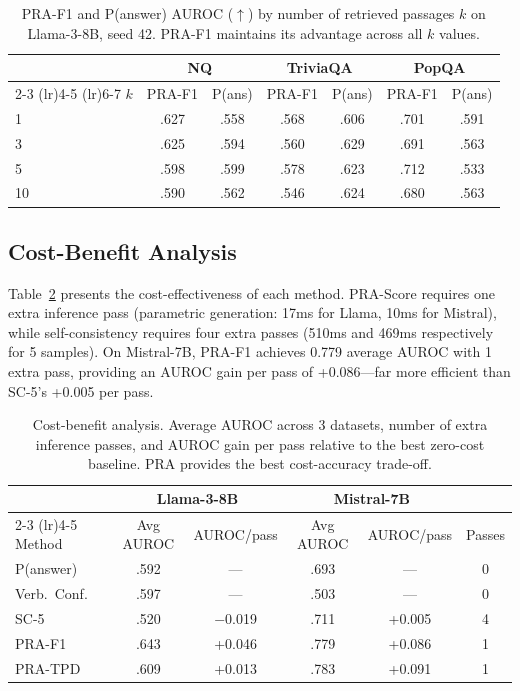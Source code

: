 \documentclass{article}
\begin{document}
\begin{table}[t]
\caption{PRA-F1 and P(answer) AUROC ($\uparrow$) by number of retrieved passages $k$ on Llama-3-8B, seed 42. PRA-F1 maintains its advantage across all $k$ values.}
\label{tab:topk}
\centering
\small
\begin{tabular}{lcccccc}
\toprule
& \multicolumn{2}{c}{NQ} & \multicolumn{2}{c}{TriviaQA} & \multicolumn{2}{c}{PopQA} \\
\cmidrule(lr){2-3} \cmidrule(lr){4-5} \cmidrule(lr){6-7}
$k$ & PRA-F1 & P(ans) & PRA-F1 & P(ans) & PRA-F1 & P(ans) \\
\midrule
1  & .627 & .558 & .568 & .606 & .701 & .591 \\
3  & .625 & .594 & .560 & .629 & .691 & .563 \\
5  & .598 & .599 & .578 & .623 & .712 & .533 \\
10 & .590 & .562 & .546 & .624 & .680 & .563 \\
\bottomrule
\end{tabular}
\end{table}

\subsection{Cost-Benefit Analysis}
\label{sec:cost_benefit}

Table~\ref{tab:cost} presents the cost-effectiveness of each method. PRA-Score requires one extra inference pass (parametric generation: 17ms for Llama, 10ms for Mistral), while self-consistency requires four extra passes (510ms and 469ms respectively for 5 samples). On Mistral-7B, PRA-F1 achieves 0.779 average AUROC with 1 extra pass, providing an AUROC gain per pass of +0.086---far more efficient than SC-5's +0.005 per pass.

\begin{table}[t]
\caption{Cost-benefit analysis. Average AUROC across 3 datasets, number of extra inference passes, and AUROC gain per pass relative to the best zero-cost baseline. PRA provides the best cost-accuracy trade-off.}
\label{tab:cost}
\centering
\small
\begin{tabular}{lccccc}
\toprule
& \multicolumn{2}{c}{Llama-3-8B} & \multicolumn{2}{c}{Mistral-7B} & \\
\cmidrule(lr){2-3} \cmidrule(lr){4-5}
Method & Avg AUROC & AUROC/pass & Avg AUROC & AUROC/pass & Passes \\
\midrule
P(answer) & .592 & --- & .693 & --- & 0 \\
Verb.\ Conf. & .597 & --- & .503 & --- & 0 \\
SC-5 & .520 & $-$0.019 & .711 & +0.005 & 4 \\
PRA-F1 & .643 & +0.046 & .779 & +0.086 & 1 \\
PRA-TPD & .609 & +0.013 & .783 & +0.091 & 1 \\
\bottomrule
\end{tabular}
\end{table}
\end{document}
